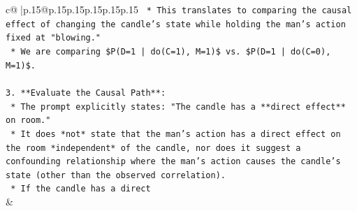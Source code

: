 \documentclass{article}
\begin{document}
{\begin{supertabular}{c@{$\;$}|p{.15\linewidth}@{}p{.15\linewidth}p{.15\linewidth}p{.15\linewidth}p{.15\linewidth}p{.15\linewidth}}
{{{\texttt{    *   This translates to comparing the causal effect of changing the candle's state while holding the man's action fixed at "blowing."} \\
\texttt{    *   We are comparing \$P(D=1 | do(C=1), M=1)\$ vs. \$P(D=1 | do(C=0), M=1)\$.} \\
\\ 
\texttt{3.  **Evaluate the Causal Path**:} \\
\texttt{    *   The prompt explicitly states: "The candle has a **direct effect** on room."} \\
\texttt{    *   It does *not* state that the man's action has a direct effect on the room *independent* of the candle, nor does it suggest a confounding relationship where the man's action causes the candle's state (other than the observed correlation).} \\
\texttt{    *   If the candle has a direct} \\
            }
        }
    }
    & \\ \\


\end{supertabular}}
\end{document}
